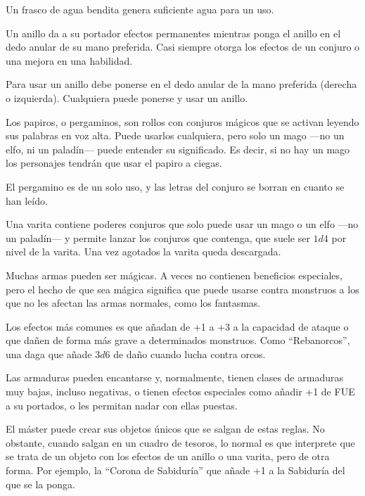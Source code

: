 \begin{multicols}{2}
Un frasco de agua bendita genera suficiente agua para un uso.


Un anillo da a su portador efectos permanentes mientras ponga el anillo en el
dedo anular de su mano preferida. Casi siempre otorga los efectos de un conjuro
o una mejora en una habilidad.

Para usar un anillo debe ponerse en el dedo anular de la mano preferida (derecha
o izquierda). Cualquiera puede ponerse y usar un anillo.


Los papiros, o pergaminos, son rollos con conjuros mágicos que se activan leyendo
sus palabras en voz alta. Puede usarlos cualquiera,
pero solo un mago ---no un elfo, ni un paladín--- puede entender su significado. Es
decir, si no hay un mago los personajes tendrán que usar el papiro a ciegas.

El pergamino es de un solo uso, y las letras del conjuro se borran en cuanto se han leído.


Una varita contiene poderes conjuros que solo puede usar un mago o un elfo ---no un paladín---
y permite lanzar los conjuros que contenga, que suele ser $ 1d4$ por nivel de la varita. Una vez
agotados la varita queda descargada.


Muchas armas pueden ser mágicas. A veces no contienen beneficios especiales, pero el hecho
de que sea mágica significa que puede usarse contra monstruos a los que no les afectan las
armas normales, como los fantasmas.

Los efectos más comunes es que añadan de +1 a +3 a la capacidad de ataque o que dañen de
forma más grave a determinados monstruos. Como \enquote{Rebanorcos}, una daga que añade $ 3d6$ de daño cuando lucha contra orcos.


Las armaduras pueden encantarse y, normalmente, tienen clases de armaduras muy bajas,
incluso negativas, o tienen efectos especiales como añadir +1 de FUE a su portados, o
les permitan nadar con ellas puestas.


El máster puede crear sus objetos únicos que se salgan de estas reglas. No obstante,
cuando salgan en un cuadro de tesoros, lo normal es que interprete que se trata de un
objeto con los efectos de un anillo o una varita, pero de otra forma. Por ejemplo, la
\enquote{Corona de Sabiduría} que añade +1 a la Sabiduría del que se la ponga.


\end{multicols}
